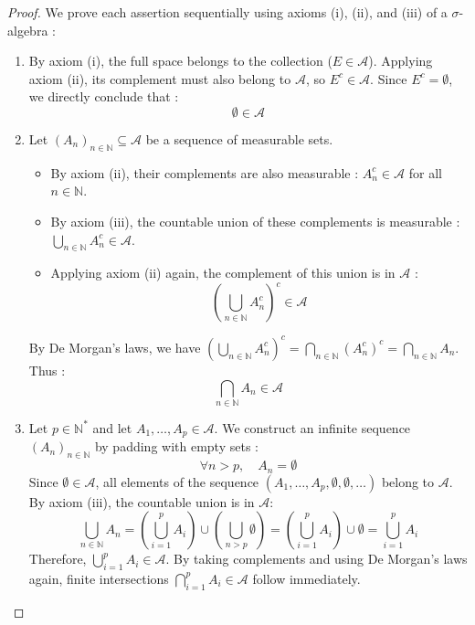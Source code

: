 \begin{proof}
We prove each assertion sequentially using axioms (i), (ii), and (iii) of a $\sigma$-algebra :

\begin{enumerate}
    \item
    By axiom (i), the full space belongs to the collection ($E \in \mathcal{A}$). Applying axiom (ii), its complement must also belong to $\mathcal{A}$, so $E^c \in \mathcal{A}$. Since $E^c = \emptyset$, we directly conclude that :
    \[
        \emptyset \in \mathcal{A}
    \]

    \item
    Let $(A_n)_{n \in \mathbb{N}} \subseteq \mathcal{A}$ be a sequence of measurable sets.
    \begin{itemize}
        \item By axiom (ii), their complements are also measurable : $A_n^c \in \mathcal{A}$ for all $n \in \mathbb{N}$.
        \item By axiom (iii), the countable union of these complements is measurable : $\bigcup_{n \in \mathbb{N}} A_n^c \in \mathcal{A}$.
        \item Applying axiom (ii) again, the complement of this union is in $\mathcal{A}$ :
        \[
            \left( \bigcup_{n \in \mathbb{N}} A_n^c \right)^c \in \mathcal{A}
        \]
    \end{itemize}
    By De Morgan's laws, we have $\left( \bigcup_{n \in \mathbb{N}} A_n^c \right)^c = \bigcap_{n \in \mathbb{N}} (A_n^c)^c = \bigcap_{n \in \mathbb{N}} A_n$. Thus :
    \[
        \bigcap_{n \in \mathbb{N}} A_n \in \mathcal{A}
    \]

    \item
    Let $p \in \mathbb{N}^*$ and let $A_1, \dots, A_p \in \mathcal{A}$. We construct an infinite sequence $(A_n)_{n \in \mathbb{N}}$ by padding with empty sets :
    \[
        \forall n > p,\quad  A_n = \emptyset 
    \]
    Since $\emptyset \in \mathcal{A}$, all elements of the sequence $(A_1, \dots, A_p, \emptyset, \emptyset, \dots)$ belong to $\mathcal{A}$. By axiom (iii), the countable union is in $\mathcal{A}$:
    \[
        \bigcup_{n \in \mathbb{N}} A_n = \left( \bigcup_{i=1}^p A_i \right) \cup \left( \bigcup_{n > p} \emptyset \right) = \left( \bigcup_{i=1}^p A_i \right) \cup \emptyset = \bigcup_{i=1}^p A_i
    \]
    Therefore, $\bigcup_{i=1}^p A_i \in \mathcal{A}$. By taking complements and using De Morgan's laws again, finite intersections $\bigcap_{i=1}^p A_i \in \mathcal{A}$ follow immediately.
\end{enumerate}
\end{proof}

